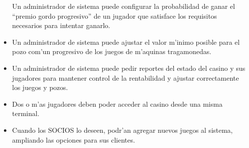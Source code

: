 \begin{itemize}
 Un administrador de sistema puede configurar la probabilidad de ganar el ``premio gordo progresivo'' de un jugador que satisface los requisitos necesarios para intentar ganarlo.

\item {}

 Un administrador de sistema puede ajustar el valor m'inimo posible para el pozo com'un progresivo de los juegos de m'aquinas tragamonedas.

\item {} 

 Un administrador de sistema puede pedir reportes del estado del casino y sus jugadores para mantener control de la rentabilidad y ajustar correctamente los juegos y pozos.

\item {}

 Dos o m'as jugadores deben poder acceder al casino desde una misma terminal.

\item {} 

 Cuando los SOCIOS lo deseen, podr'an agregar nuevos juegos al sistema, ampliando las opciones para sus clientes.

\end{itemize}

\clearpage


